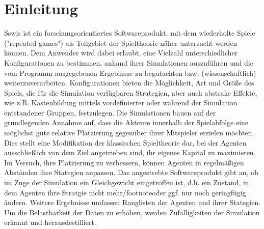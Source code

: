 \section{Einleitung}

Sswis ist ein forschungsorientiertes Softwareprodukt, mit dem wiederholte Spiele ("repeated games") als Teilgebiet der Spieltheorie näher untersucht werden können.
Dem Anwender wird dabei erlaubt, eine Vielzahl unterschiedlicher Konfigurationen zu bestimmen, anhand ihrer Simulationen auszuführen und die vom Programm ausgegebenen Ergebinsse zu begutachten bzw. (wissenschaftlich) weiterzuverarbeiten.
Konfigurationen bieten die Möglichkeit, Art und Größe des Spiels, die für die Simulation verfügbaren Strategien, aber auch abstrake Effekte, wie z.B. Kastenbildung mittels vordefinierter oder während der Simulation entstandener Gruppen, festzulegen.
Die Simulationen bauen auf der grundlegenden Annahme auf, dass die Akteure innerhalb der Spielabfolge eine möglichst gute relative Platzierung gegenüber ihrer Mitspieler erzielen möchten.
Dies stellt eine Modifikation der klassischen Spieltheorie dar, bei der Agenten ausschließlich von dem Ziel angetrieben sind, ihr eigenes Kapital zu maximieren.
Im Versuch, ihre Platzierung zu verbessern, können Agenten in regelmäßigen Abständen ihre Stategien anpassen.
Das angestrebte Softwareprodukt gibt an, ob im Zuge der Simulation ein Gleichgewicht eingetroffen ist, d.h. ein Zustand, in dem Agenten ihre Stratgie nicht mehr/footnote{oder ggf. nur noch geringfügig} ändern.
Weitere Ergebnisse umfassen Ranglisten der Agenten und ihrer Stategien.
Um die Belastbarkeit der Daten zu erhöhen, werden Zufälligkeiten der Simulation erkannt und herausdestilliert.